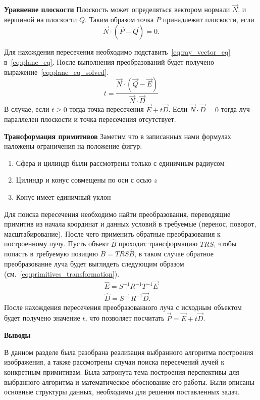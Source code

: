 \textbf{Уравнение плоскости}
Плоскость может определяться вектором нормали $\vec{N}$, и вершиной на плоскости $Q$. Таким образом точка $P$ принадлежит плоскости, если 
\begin{equation}
	\vec{N} \cdot (\vec{P} - \vec{Q}) = 0.
	\label{eq:plane_eq}
\end{equation}

Для нахождения пересечения необходимо подставить~\ref{eq:ray_vector_eq} в~\ref{eq:plane_eq}. После выполнения преобразований будет получено
выражение~\ref{eq:plane_eq_solved}.
\begin{equation}
	t=\frac{\vec{N} \cdot (\vec{Q} - \vec{E})}{\vec{N} \cdot \vec{D}}
	\label{eq:plane_eq_solved}
\end{equation}
В случае, если $t \ge 0$ тогда точка пересечения $\vec{E} + t\vec{D}$. Если $\vec{N} \cdot \vec{D} = 0$ тогда луч параллелен плоскости и
точка пересечения отсутствует.\cite{primitives_raytracing_equations}


\textbf{Трансформация примитивов}
Заметим что в записанных нами формулах наложены ограничения на положение фигур:
\begin{enumerate}
	\item Сфера и цилиндр были рассмотрены только с единичным радиусом
	\item Цилиндр и конус совмещены по оси с осью $z$
	\item Конус имеет единичный уклон
\end{enumerate}
Для поиска пересечения необходимо найти преобразования, переводящие примитив из начала координат и данных условий в требуемые (перенос, поворот, масштабирование).
После чего применить обратные преобразования к построенному лучу.
Пусть объект $\hat{B}$ проходит трансформацию $TRS$, чтобы попасть в требуемую позицию $B = TRS\hat{B}$, в таком случае обратное преобразование луча будет выглядеть
следующим образом (см.~\ref{eq:primitives_transformation}).
\begin{equation}
	\label{eq:primitives_transformation}
	\begin{aligned}
		\hat{E} = S^{-1}R^{-1}T^{-1}\vec{E}\\
		\hat{D} = S^{-1}R^{-1}\vec{D}.
	\end{aligned}
\end{equation}
После нахождения пересечения преобразованного луча с исходным объектом будет получено значение $t$, что позволяет посчитать $\vec{P} = \vec{E} +t\vec{D}$.




\textbf{Выводы}

В данном разделе была разобрана реализация выбранного алгоритма построения изображения, а также рассмотрены случаи поиска пересечений лучей  к конкретным примитивам. 
Была затронута тема построения перспективы для выбранного алгоритма и математическое обоснование его работы. Были описаны основные структуры данных, необходимы для решения поставленных задач.




